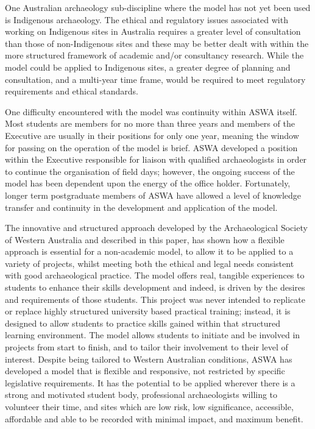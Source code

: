 \documentclass[%
]{ijsra}
\begin{document}
	One Australian archaeology sub-discipline where the model has not yet been used is Indigenous archaeology. The ethical and regulatory issues associated with working on Indigenous sites in Australia requires a greater level of consultation than those of non-Indigenous sites and these may be better dealt with within the more structured framework of academic and/or consultancy research. 
	While the model could be applied to Indigenous sites, a greater degree of planning and consultation, and a multi-year time frame, would be required to meet regulatory requirements and ethical standards.
	
	One difficulty encountered with the model was continuity within ASWA itself. Most students are members for no more than three years and members of the Executive are usually in their positions for only one year, meaning the window for passing on the operation of the model is brief. 
	ASWA developed a position within the Executive responsible for liaison with qualified archaeologists in order to continue the organisation of field days; however, the ongoing success of the model has been dependent upon the energy of the office holder. 
	Fortunately, longer term postgraduate members of ASWA have allowed a level of knowledge transfer and continuity in the development and application of the model.
	
	
	The innovative and structured approach developed by the Archaeological Society of Western Australia and described in this paper, has shown how a flexible approach is essential for a non-academic model, to allow it to be applied to a variety of projects, whilst meeting both the ethical and legal needs consistent with good archaeological practice. 
	The model offers real, tangible experiences to students to enhance their skills development and indeed, is driven by the desires and requirements of those students. This project was never intended to replicate or replace highly structured university based practical training; instead, it is designed to allow students to practice skills gained within that structured learning environment. 
	The model allows students to initiate and be involved in projects from start to finish, and to tailor their involvement to their level of interest. Despite being tailored to Western Australian conditions, ASWA has developed a model that is flexible and responsive, not restricted by specific legislative requirements. 
	It has the potential to be applied wherever there is a strong and motivated student body, professional archaeologists willing to volunteer their time, and sites which are low risk, low significance, accessible, affordable and able to be recorded with minimal impact, and maximum benefit. 
	
\end{document}
